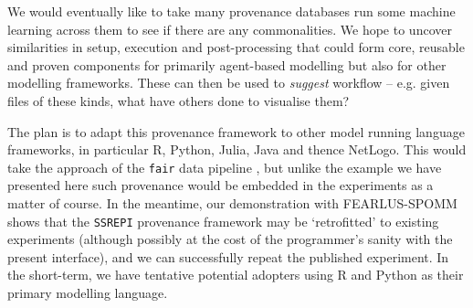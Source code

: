 \documentclass[runningheads]{llncs}
\begin{document}
We would eventually like to take many provenance databases run some machine learning across them to see if there are any commonalities. We hope to uncover similarities in setup, execution and post-processing that could form core, reusable and proven components for primarily agent-based modelling but also for other modelling frameworks. These can then be used to \textit{suggest} workflow -- e.g. given files of these kinds, what have others done to visualise them?

The plan is to adapt this provenance framework to other model running language
frameworks, in particular R, Python, Julia, Java and thence NetLogo. This would
take the approach of the \texttt{fair} data pipeline \cite{mitchell2022fair}, but unlike
the example we have presented here such provenance would be embedded in the
experiments as a matter of course. In the meantime, our demonstration with FEARLUS-SPOMM shows that the \texttt{SSREPI} provenance framework may be `retrofitted' to existing
experiments (although possibly at the cost of the programmer's sanity with the present interface), and we can successfully repeat the published experiment. In the short-term, we have tentative potential adopters using R and Python as their primary modelling language.

%
%


% 
%
\end{document}
